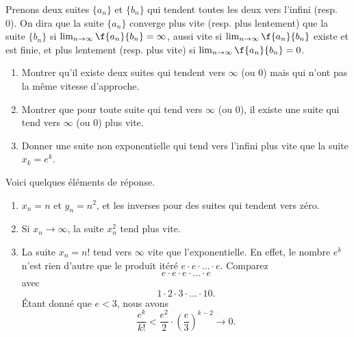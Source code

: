 \begin{example}     \label{EXooGESBooQYOCpk}

	Prenons deux suites \( \{a_n\}\) et  \( \{b_n\}\) qui tendent toutes les deux vers l'infini (resp. 0). On dira que la suite \( \{a_n\}\) converge plus vite (resp. plus lentement) que la suite \( \{b_n\}\) si \( \lim_{n\rightarrow \infty}\f{a_n}{b_n} = \infty\), aussi vite si \( \lim_{n\rightarrow \infty}\f{a_n}{b_n} \) existe et est finie, et plus lentement (resp. plus vite)  si \( \lim_{n\rightarrow \infty}\f{a_n}{b_n} = 0\).
	\begin{enumerate}
		\item Montrer qu'il existe deux suites qui tendent vers \( \infty\) (ou 0) mais qui n'ont pas la même  vitesse d'approche.
		\item Montrer que pour toute suite qui tend vers  \( \infty\) (ou 0), il existe une suite qui tend vers  \( \infty\) (ou 0) plus vite.
		\item Donner une suite non exponentielle qui tend vers l'infini plus vite que la suite \( x_k = e^k\).
	\end{enumerate}

	Voici quelques éléments de réponse.

	\begin{enumerate}
		\item \( x_n=n\) et \( y_n=n^2\), et les inverses pour des suites qui tendent vers zéro.
		\item Si \( x_n\to\infty\), la suite \( x_n^2\) tend plus vite.
		\item La suite \( x_n=n!\) tend vers \( \infty\) vite que l'exponentielle. En effet, le nombre \( e^k\) n'est rien d'autre que le produit itéré \( e\cdot e\cdot\ldots\cdot e\). Comparez
		      \begin{equation}
			      e\cdot e\cdot e\cdot\ldots\cdot e
		      \end{equation}
		      avec
		      \begin{equation}
			      1\cdot 2\cdot 3\cdot\ldots\cdot 10.
		      \end{equation}
		      Étant donné que \( e<3\), nous avons
		      \begin{equation}
			      \frac{ e^k }{ k! }<\frac{ e^2 }{ 2 }\cdot\left( \frac{ e }{ 3 } \right)^{k-2}\to 0.
		      \end{equation}

	\end{enumerate}
\end{example}

